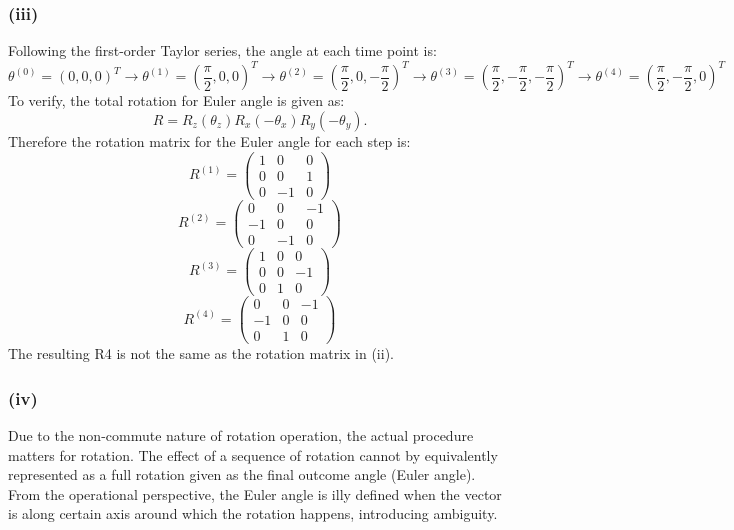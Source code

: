 \documentclass[11pt]{article}
\begin{document}
\subsubsection*{(iii)}
Following the first-order Taylor series, the angle at each time point is:
\[
    \theta^{(0)}=(0,0,0)^T\to\theta^{(1)}=(\frac{\pi}{2},0,0)^T\to\theta^{(2)}=(\frac{\pi}{2},0,-\frac{\pi}{2})^T\to\theta^{(3)}=(\frac{\pi}{2},-\frac{\pi}{2},-\frac{\pi}{2})^T\to\theta^{(4)}=(\frac{\pi}{2},-\frac{\pi}{2},0)^T 
\]
To verify, the total rotation for Euler angle is given as:
\begin{equation}
    R = R_z(\theta_z)R_x(-\theta_x)R_y(-\theta_y). 
\end{equation}
Therefore the rotation matrix for the Euler angle for each step is:
\begin{equation}
    R^{(1)} = \begin{pmatrix}1&0&0\\0&0&1\\0&-1&0\end{pmatrix}  
\end{equation}
\begin{equation}
    R^{(2)} = \begin{pmatrix}0&0&-1\\-1&0&0\\0&-1&0\end{pmatrix}  
\end{equation}
\begin{equation}
    R^{(3)} = \begin{pmatrix}1&0&0\\0&0&-1\\0&1&0\end{pmatrix}  
\end{equation}
\begin{equation}
    R^{(4)} = \begin{pmatrix}0&0&-1\\-1&0&0\\0&1&0\end{pmatrix}  
\end{equation}
The resulting R4 is not the same as the rotation matrix in (ii).

\subsubsection*{(iv)}
Due to the non-commute nature of rotation operation, the actual procedure matters for rotation. The effect of a sequence of rotation cannot by equivalently represented as a full rotation given as the final outcome angle (Euler angle). 
From the operational perspective, the Euler angle is illy defined when the vector is along certain axis around which the rotation happens, introducing ambiguity. 
\end{document}
